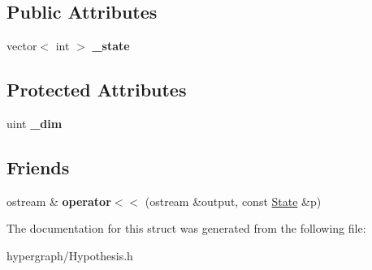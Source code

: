 \subsection*{Public Attributes}
\begin{DoxyCompactItemize}
\item 
\hypertarget{struct_scarab_1_1_h_g_1_1_state_a1c516b546a5e3de3a5f9bb8f39a3cf20}{
vector$<$ int $>$ {\bfseries \_\-state}}
\label{struct_scarab_1_1_h_g_1_1_state_a1c516b546a5e3de3a5f9bb8f39a3cf20}

\end{DoxyCompactItemize}
\subsection*{Protected Attributes}
\begin{DoxyCompactItemize}
\item 
\hypertarget{struct_scarab_1_1_h_g_1_1_state_ae3d755b161845bd295deae4096d4c9f8}{
uint {\bfseries \_\-dim}}
\label{struct_scarab_1_1_h_g_1_1_state_ae3d755b161845bd295deae4096d4c9f8}

\end{DoxyCompactItemize}
\subsection*{Friends}
\begin{DoxyCompactItemize}
\item 
\hypertarget{struct_scarab_1_1_h_g_1_1_state_a353ffb342165fcaec0e812d0288fc329}{
ostream \& {\bfseries operator$<$$<$} (ostream \&output, const \hyperlink{struct_scarab_1_1_h_g_1_1_state}{State} \&p)}
\label{struct_scarab_1_1_h_g_1_1_state_a353ffb342165fcaec0e812d0288fc329}

\end{DoxyCompactItemize}


The documentation for this struct was generated from the following file:\begin{DoxyCompactItemize}
\item 
hypergraph/Hypothesis.h\end{DoxyCompactItemize}
